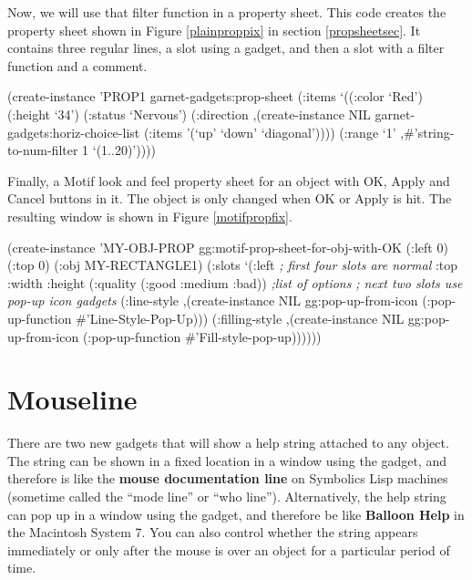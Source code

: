 Now, we will use that filter function in a property sheet.  This code creates
the property sheet shown in Figure \ref{plainproppix} in section
\ref{propsheetsec}.  It contains three regular lines, a slot using a
gadget, and then a slot with a filter function and a comment.

\begin{programexample}
(create-instance 'PROP1 garnet-gadgets:prop-sheet
   (:items `((:color `Red')
             (:height `34')
	     (:status `Nervous')
	     (:direction ,(create-instance NIL garnet-gadgets:horiz-choice-list
			    (:items '(`up' `down' `diagonal'))))
	     (:range `1' ,\#'string-to-num-filter 1 `(1..20)'))))
\end{programexample}

\begin{group}
Finally, a Motif look and feel property sheet for an object with OK, Apply and
Cancel buttons in it.  The  object is only changed when OK
or Apply is hit. The resulting window is shown in Figure
\ref{motifpropfix}.

\begin{programexample}
(create-instance 'MY-OBJ-PROP gg:motif-prop-sheet-for-obj-with-OK
  (:left 0)
  (:top 0)
  (:obj MY-RECTANGLE1)
  (:slots `(:left {\it ; first four slots are normal}
	    :top
	    :width
	    :height
	    (:quality (:good :medium :bad)) {\it ;list of options}
	    {\it ; next two slots use pop-up icon gadgets}
	    (:line-style ,(create-instance NIL gg:pop-up-from-icon
			    (:pop-up-function \#'Line-Style-Pop-Up)))
	    (:filling-style ,(create-instance NIL gg:pop-up-from-icon
			       (:pop-up-function \#'Fill-style-pop-up))))))
\end{programexample}
\end{group}



\section{Mouseline}
There are two new gadgets that will show a help string attached to any
object.  The string can be shown in a fixed location in a
window using the  gadget, and therefore is like the
{\bf mouse documentation line} on Symbolics Lisp
machines (sometime called the
``mode line'' or ``who line'').
Alternatively, the help string can pop up in a window using
the  gadget, and therefore be
like {\bf Balloon Help} in the Macintosh System 7.  You can also control
whether the string appears immediately or only after the mouse is over
an object for a particular period of time.

